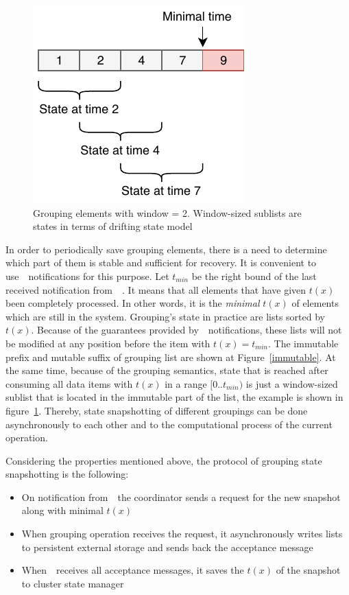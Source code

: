 \begin{figure}[htbp]
  \centering
  \includegraphics[width=0.5\columnwidth]{pics/substate}
  \caption{Grouping elements with window = 2. Window-sized sublists are states in terms of drifting state model}
  \label {substate}
\end{figure}

In order to periodically save grouping elements, there is a need to determine which part of them is stable and sufficient for recovery. It is convenient to use~\Acker\ notifications for this purpose. Let $t_{min}$ be the right bound of the last received notification from~\Acker\ . It means that all elements that have given $t(x)$ been completely processed. In other words, it is the {\em minimal} $t(x)$ of elements which are still in the system.  
Grouping's state in practice are lists sorted by $t(x)$. Because of the guarantees provided by~\Acker\ notifications, these lists will not be modified at any position before the item with $t(x)=t_{min}$. The immutable prefix and mutable suffix of grouping list are shown at Figure~\ref{immutable}. At the same time, because of the grouping semantics, state that is reached after consuming all data items with $t(x)$ in a range $[0..t_{min})$ is just a window-sized sublist that is located in the immutable part of the list, the example is shown in figure~\ref{substate}. Thereby, state snapshotting of different groupings can be done asynchronously to each other and to the computational process of the current operation. 

Considering the properties mentioned above, the protocol of grouping state snapshotting is the following:

\begin{itemize}
    \item On notification from~\Acker\, the coordinator sends a request for the new snapshot along with minimal $t(x)$
    \item When grouping operation receives the request, it asynchronously writes lists to persistent external storage and sends back the acceptance message
    \item When~\Acker\ receives all acceptance messages, it saves the $t(x)$ of the snapshot to cluster state manager
\end{itemize}

